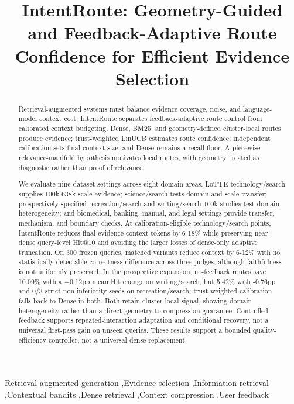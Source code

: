 \documentclass[a4paper,fleqn,doubleblind]{cas-sc}
\begin{document}

\title[mode=title]{IntentRoute: Geometry-Guided and Feedback-Adaptive Route Confidence for Efficient Evidence Selection}

\begin{abstract}
Retrieval-augmented systems must balance evidence coverage, noise, and language-model context cost. IntentRoute separates feedback-adaptive route control from calibrated context budgeting. Dense, BM25, and geometry-defined cluster-local routes produce evidence; trust-weighted LinUCB estimates route confidence; independent calibration sets final context size; and Dense remains a recall floor. A piecewise relevance-manifold hypothesis motivates local routes, with geometry treated as diagnostic rather than proof of relevance.

We evaluate nine dataset settings across eight domain areas. LoTTE technology/search supplies 100k-638k scale evidence; science/search tests domain and scale transfer; prospectively specified recreation/search and writing/search 100k studies test domain heterogeneity; and biomedical, banking, manual, and legal settings provide transfer, mechanism, and boundary checks. At calibration-eligible technology/search points, IntentRoute reduces final evidence-context tokens by 6-18\% while preserving near-dense query-level $\mathrm{Hit@10}$ and avoiding the larger losses of dense-only adaptive truncation. On 300 frozen queries, matched variants reduce context by 6-12\% with no statistically detectable correctness difference across three judges, although faithfulness is not uniformly preserved. In the prospective expansion, no-feedback routes save 10.09\% with a +0.12pp mean Hit change on writing/search, but 5.42\% with -0.76pp and 0/3 strict non-inferiority seeds on recreation/search; trust-weighted calibration falls back to Dense in both. Both retain cluster-local signal, showing domain heterogeneity rather than a direct geometry-to-compression guarantee. Controlled feedback supports repeated-interaction adaptation and conditional recovery, not a universal first-pass gain on unseen queries. These results support a bounded quality-efficiency controller, not a universal dense replacement.
\end{abstract}

\begin{keywords}
Retrieval-augmented generation \sep Evidence selection \sep Information retrieval
\sep Contextual bandits \sep Dense retrieval \sep Context compression \sep User feedback
\end{keywords}
\end{document}
